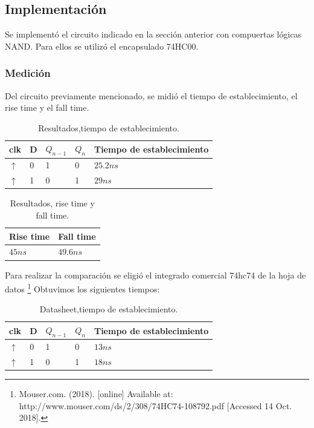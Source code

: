 \documentclass[../../e3_tp2_main.tex]{subfiles}
\begin{document}
\subsection{Implementación}
Se implementó el circuito indicado en la sección anterior con compuertas lógicas NAND. Para ellos se utilizó el encapsulado 74HC00.
\subsubsection{Medición}
Del circuito previamente mencionado, se midió el tiempo de establecimiento, el rise time y el fall time. 

\begin{table}[h]
\begin{center}
\begin{tabular}{|l|l|l|l|l|}
\hline
clk& D & $Q_{n-1}$ & $Q_n$ &Tiempo de establecimiento\\
\hline \hline
$\uparrow$ &0& 1&0&$25.2 n s$  \\ \hline
$\uparrow$ &1&0&1&$29 n s$  \\ \hline
\end{tabular}
\caption{Resultados,tiempo de establecimiento.} 
\end{center}
\end{table}

\begin{table}[h]
\begin{center}
\begin{tabular}{|l|l|}
\hline
Rise time& Fall time \\
\hline \hline
$45 n s$  & $49.6 n s$ \\ \hline
\end{tabular}
\caption{Resultados, rise time y fall time.} 
\end{center}
\end{table}

Para realizar la comparación se eligió el integrado comercial 74hc74 de la hoja de datos
\footnote{Mouser.com. (2018). [online] Available at: http://www.mouser.com/ds/2/308/74HC74-108792.pdf [Accessed 14 Oct. 2018].}
 Obtuvimos los siguientes tiempos:

\begin{table}[H]
\begin{center}
\begin{tabular}{|l|l|l|l|l|}
\hline
clk& D & $Q_{n-1}$ & $Q_n$ &Tiempo de establecimiento\\
\hline \hline
$\uparrow$ &0& 1&0&$13 n s$  \\ \hline
$\uparrow$ &1&0&1&$18 n s$  \\ \hline
\end{tabular}
\caption{Datasheet,tiempo de establecimiento.} 
\end{center}
\end{table}
\end{document}

